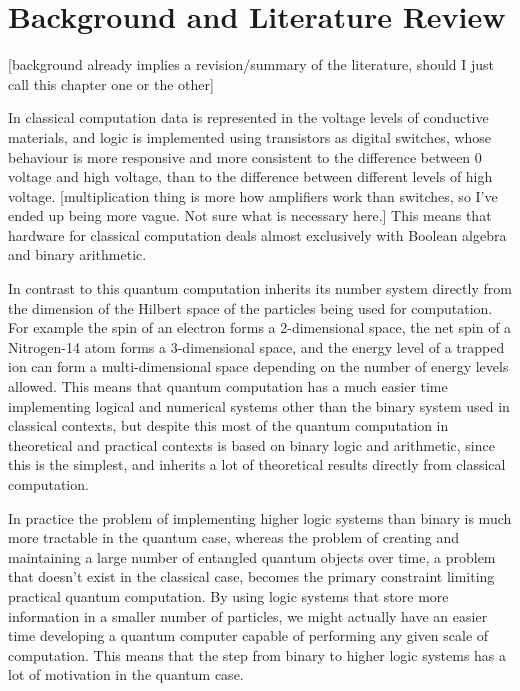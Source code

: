 
\chapter[BACKGROUND AND LITERATURE REVIEW]{Background and Literature Review}
[background already implies a revision/summary of the literature, should I just call this chapter one or the other]

In classical computation data is represented in the voltage levels of conductive materials, and logic is implemented using transistors as digital switches, whose behaviour is more responsive and more consistent to the difference between 0 voltage and high voltage, than to the difference between different levels of high voltage. [multiplication thing is more how amplifiers work than switches, so I've ended up being more vague. Not sure what is necessary here.] This means that hardware for classical computation deals almost exclusively with Boolean algebra and binary arithmetic.

In contrast to this quantum computation inherits its number system directly from the dimension of the Hilbert space of the particles being used for computation. For example the spin of an electron forms a 2-dimensional space, the net spin of a Nitrogen-14 atom forms a 3-dimensional space, and the energy level of a trapped ion can form a multi-dimensional space depending on the number of energy levels allowed. This means that quantum computation has a much easier time implementing logical and numerical systems other than the binary system used in classical contexts, but despite this most of the quantum computation in theoretical and practical contexts is based on binary logic and arithmetic, since this is the simplest, and inherits a lot of theoretical results directly from classical computation.

In practice the problem of implementing higher logic systems than binary is much more tractable in the quantum case, whereas the problem of creating and maintaining a large number of entangled quantum objects over time, a problem that doesn't exist in the classical case, becomes the primary constraint limiting practical quantum computation. By using logic systems that store more information in a smaller number of particles, we might actually have an easier time developing a quantum computer capable of performing any given scale of computation. This means that the step from binary to higher logic systems has a lot of motivation in the quantum case.

